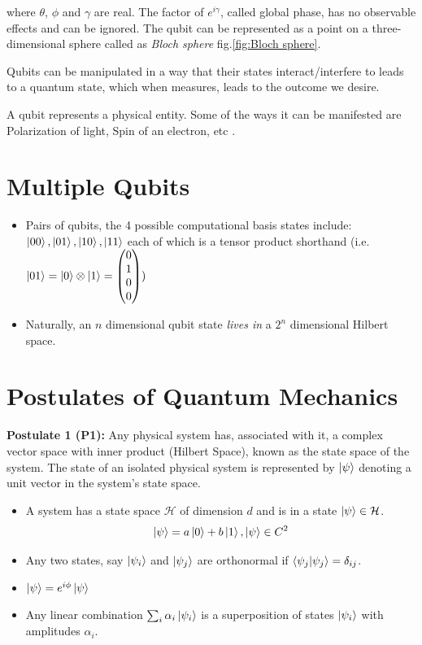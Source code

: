 \documentclass[11.5pt, paper=a4]{article}
\theoremstyle{definition}
\numberwithin{theorem}{section}
\begin{document}
where $\theta$, $\phi$ and $\gamma$ are real. The factor of $e^{i\gamma}$, called global phase, has no observable effects and can be ignored. The qubit can be represented as a point on a three-dimensional sphere called as \textit{Bloch sphere} fig.\ref{fig:Bloch sphere}.

Qubits can be manipulated in a way that their states interact/interfere to leads to a quantum state, which when measures, leads to the outcome we desire.

A qubit represents a physical entity. Some of the ways it can be manifested are Polarization of light, Spin of an electron, etc \cite{physical_qubits}.


\section{Multiple Qubits}
\begin{itemize}
    \item Pairs of qubits, the 4 possible computational basis states include: $\ket{00}, \ket{01}, \ket{10}, \ket{11}$ each of which is a tensor product shorthand (i.e. $\ket{01} = \ket{0} \otimes \ket{1} =
    \begin{pmatrix}
    0 \\
    1 \\
    0 \\
    0
    \end{pmatrix}) $
    \item Naturally, an $n$ dimensional qubit state \emph{lives in} a $2^n$ dimensional Hilbert space.
\end{itemize}


\section{Postulates of Quantum Mechanics}
\textbf{Postulate 1 (P1):} Any physical system has, associated with it, a complex vector space with inner product (Hilbert Space), known as the state space of the system. The state of an isolated physical system is represented by $\ket{\psi}$ denoting a unit vector in the system's state space.
\begin{itemize}
    \item A system has a state space $\mathcal{H}$ of dimension $d$ and is in a state $\ket{\psi} \in \mathcal{H}$.
    \begin{equation*}
        \ket{\psi} = a\ket{0} + b\ket{1}, \ket{\psi} \in C^2
    \end{equation*}
    \item Any two states, say $\ket{\psi_i}$ and $\ket{\psi_j}$ are orthonormal if $\braket{\psi_j|\psi_j} = \delta_{ij}$.
    \item $\ket{\psi} = e^{i\phi} \ket{\psi}$
    \item Any linear combination $\sum_i \alpha_i \ket{\psi_i}$ is a superposition of states $\ket{\psi_i}$ with amplitudes $\alpha_i$.
\end{itemize}
\end{document}
